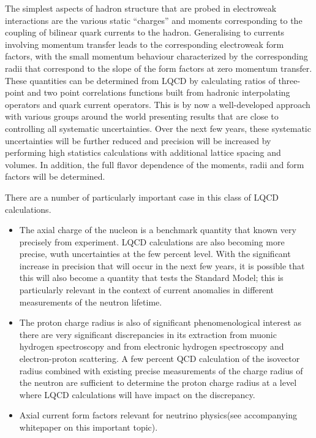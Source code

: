 The simplest aspects of hadron structure that are probed in electroweak interactions are the various static ``charges'' and moments corresponding to the coupling of bilinear quark currents to the hadron. Generalising to currents involving momentum transfer leads to the corresponding electroweak form factors, with the small momentum behaviour characterized by the corresponding radii that correspond to the slope of the form factors at zero momentum transfer. These quantities can be determined from LQCD by calculating ratios of three-point and two point correlations functions built from hadronic interpolating operators and quark current operators. This is by now a well-developed approach with various groups around the world presenting results that are close to controlling all systematic uncertainties. Over the next few years, these systematic uncertainties will be further reduced  and  precision will be increased by performing high statistics calculations with additional lattice spacing and volumes. In addition, the full flavor dependence of the moments, radii and form factors will be determined. 

There are a number of particularly important case in this class of LQCD calculations. 
\begin{itemize}
	\item The axial charge of the nucleon is a benchmark quantity that known very precisely from experiment. LQCD calculations are also becoming more precise, wuth uncertainties at the few percent level. With the significant increase in precision that will occur in the next few years, it is possible that this will also become a quantity that tests the Standard Model; this is particularly relevant in the context of current anomalies in different measurements of the neutron lifetime.
	\item The proton charge radius is also of significant phenomenological interest as there are very significant discrepancies in its extraction from muonic hydrogen spectroscopy  and from electronic hydrogen spectroscopy and electron-proton scattering. A few percent QCD calculation of the isovector radius combined with existing precise measurements of the charge radius of the neutron are sufficient to determine the proton charge radius at a level where  LQCD calculations will  have impact on the discrepancy.
	\item Axial current form factors relevant for neutrino physics(see accompanying whitepaper on this important topic).
\end{itemize} 


